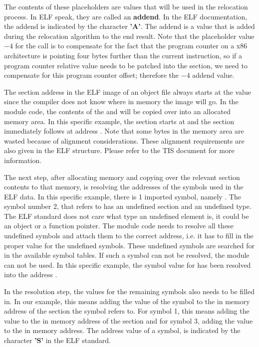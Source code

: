 The contents of these placeholders are values that will be used in the
relocation process. In ELF speak, they are called an \textbf{addend}. In the ELF
documentation, the addend is indicated by the character \textbf{'A'}. The
addend is a value that is added during the relocation algorithm to the end
result. Note that the placeholder value $-4$ for the call is to compensate
for the fact that the program counter on a x86 architecture is pointing four
bytes further than the current instruction, so if a program counter relative value needs to be
patched into the  section, we need to compensate for this
program counter offset; therefore the $-4$ addend value.

The section address in the ELF image of an object file always starts at the
value 
since the compiler does not know where in memory the image will go. In the
module code, the contents of the  and  will be
copied over into an allocated memory area. In this specific example, the
 section starts at  and the 
section immediately follows at address . Note that some bytes
in the  memory area are wasted because of alignment
considerations. These alignment requirements are also given in the ELF
structure. Please refer to the TIS document for more information.

The next step, after allocating memory and copying over the relevant section
contents to that memory, is resolving the addresses of the symbols used in
the ELF data. In this specific example, there is 1 imported symbol, namely
. The symbol
number 2, that refers to  has an undefined section and an
undefined type. The ELF standard does not care what type an undefined
element is, it could be an object or a function pointer. The module code
needs to resolve all these undefined symbols and attach them to the correct
address, i.e. it has to fill in the proper value for the undefined symbols.
These undefined symbols are searched for in the available symbol tables. If
such a symbol can not be resolved, the module can not be used. In this
specific example, the symbol value for  has been resolved
into the address .

In the resolution step, the values for the remaining symbols also needs to
be filled in. In our example, this means adding the value of the symbol to
the in memory address of the section the symbol refers to. For symbol 1,
this means adding the value to the in memory address of the 
section and for symbol 3, adding the value to the  in memory address.
The address value of a symbol, is indicated by the character \textbf{'S'} in
the ELF standard.

